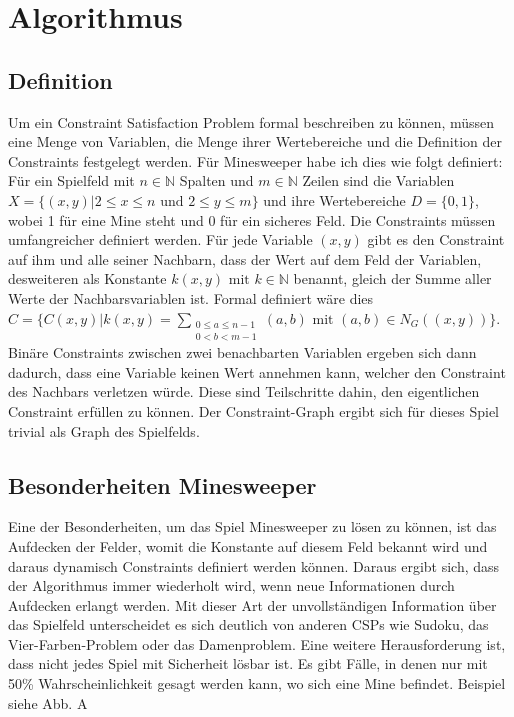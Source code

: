 %
\graphicspath{{chapters/images/}}
\section{Algorithmus}

\subsection*{Definition}
Um ein Constraint Satisfaction Problem formal beschreiben zu können, müssen eine Menge von Variablen, die Menge 
ihrer Wertebereiche und die Definition der Constraints festgelegt werden. Für Minesweeper habe ich dies wie folgt definiert:
Für ein Spielfeld mit $n\in \mathbb{N}$ Spalten und $m\in\mathbb{N}$ Zeilen sind
die Variablen $X=\{(x, y) | 2\le x\le n  \text{ und }  2\le y\le m\}$ und ihre Wertebereiche $D=\{0, 1\}$, wobei 1
für eine Mine steht und 0 für ein sicheres Feld.
Die Constraints müssen umfangreicher definiert werden. Für jede Variable $(x, y)$ gibt es den Constraint auf ihm und alle seiner 
Nachbarn, dass der Wert auf dem Feld der Variablen, desweiteren als Konstante $k(x, y) \text{ mit } k\in\mathbb{N}$ 
benannt, gleich der Summe aller Werte der Nachbarsvariablen ist. Formal definiert wäre dies
$C=\{C(x, y) | k(x, y) = \sum_{\substack{0\le a\le n-1\\0<b<m-1}}{(a, b)} \text{ mit } (a, b)\in N_G((x, y))\}$.
Binäre Constraints zwischen zwei benachbarten Variablen ergeben sich dann dadurch, dass eine Variable keinen Wert annehmen kann, 
welcher den Constraint des Nachbars verletzen würde. Diese sind Teilschritte dahin, den eigentlichen Constraint erfüllen zu können.
Der Constraint-Graph ergibt sich für dieses Spiel trivial als Graph des Spielfelds.

\subsection*{Besonderheiten Minesweeper}
Eine der Besonderheiten, um das Spiel Minesweeper zu lösen zu können, ist das Aufdecken der Felder, womit die Konstante auf diesem Feld
bekannt wird und daraus dynamisch Constraints definiert werden können. Daraus ergibt sich, dass der Algorithmus immer wiederholt wird,
wenn neue Informationen durch Aufdecken erlangt werden. Mit dieser Art der unvollständigen Information über das Spielfeld unterscheidet es
sich deutlich von anderen CSPs wie Sudoku, das Vier-Farben-Problem oder das Damenproblem.
Eine weitere Herausforderung ist, dass nicht jedes Spiel mit Sicherheit lösbar ist. Es gibt Fälle, in denen nur mit 50\% Wahrscheinlichkeit
gesagt werden kann, wo sich eine Mine befindet. Beispiel siehe Abb. A

